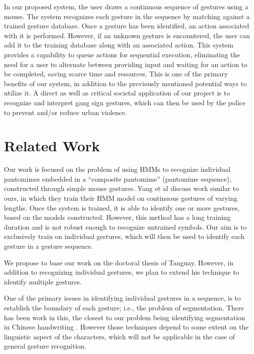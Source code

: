 \documentclass[twoside]{article}
\begin{document}
\begin{multicols}{2}
In our proposed system, the user draws a continuous sequence of gestures using a mouse. The system recognizes each gesture in the sequence 
by matching against a trained gesture database. Once a gesture has been identified, an action associated with it is performed. However, if an unknown gesture is encountered, the user can add it to the training database along with an associated action. This system provides a capability to queue actions for sequential execution, eliminating the need for a user to alternate between providing input and waiting for an action to be completed, saving scarce time and resources. This is one of the primary benefits of our system, in addition to the previously mentioned potential ways to utilize it. A direct as well as critical societal application of our project is to recognize and interpret gang sign gestures, which can then be used by the police to prevent and/or reduce urban violence.

\section{Related Work}

Our work is focused on the problem of using HMMs to
recognize individual pantomimes embedded in a ``composite pantomime'' (pantomime
sequence), constructed through simple mouse gestures. %
Yang et al \cite{yang_gesture_1994} discuss work similar to ours, in which they train their HMM model on continuous gestures of varying lengths. Once the system is trained, it is able to identify one or more gestures, based on the models constructed. However, this method has a long training duration and is not robust enough to recognize untrained symbols. Our aim is to exclusively train on individual gestures, which will then be used to identify each gesture in a gesture sequence. 

We propose to base our work on the doctoral thesis of Tanguay\cite{tanguay_jr_hidden_1995}. However, in addition to recognizing individual gestures, we plan to extend his technique to identify multiple gestures.

One of the primary issues in identifying individual gestures in a sequence, is to establish the boundary of each gesture; i.e., the problem of segmentation. There has been work in this, the closest to our problem being identifying segmentation in Chinese handwriting \cite{hong1998segmentation}. However those techniques depend to some extent on the linguistic aspect of the characters, which will not be applicable in the case of general gesture recognition.


\end{multicols}
\end{document}
